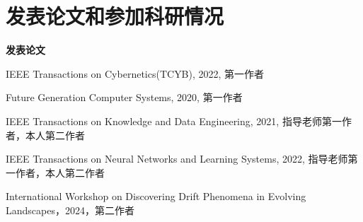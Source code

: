

\chapter*{发表论文和参加科研情况}
%
%
%
%
%
%
\setlength{\parindent}{0em}
\textbf{发表论文}
\begin{publist}
    \item IEEE Transactions on Cybernetics(TCYB), 2022, 第一作者
    \item Future Generation Computer Systems, 2020, 第一作者
    \item IEEE Transactions on Knowledge and Data Engineering, 2021, 指导老师第一作者，本人第二作者
    \item IEEE Transactions on Neural Networks and Learning Systems, 2022, 指导老师第一作者，本人第二作者
    \item International Workshop on Discovering Drift Phenomena in Evolving Landscapes，2024，第二作者
\end{publist}

